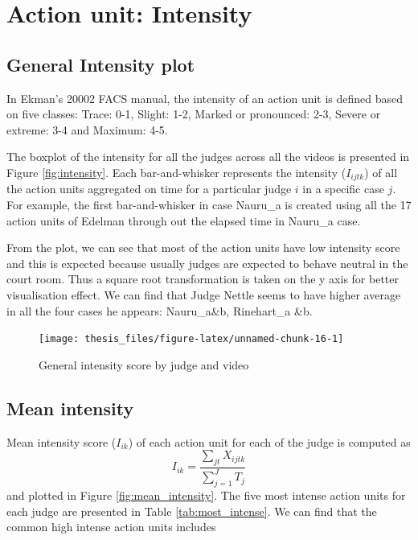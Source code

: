 \documentclass{monashthesis}
\begin{document}
\hypertarget{action-unit-intensity}{%
\section{Action unit: Intensity}\label{action-unit-intensity}}

\hypertarget{general-intensity-plot}{%
\subsection{General Intensity plot}\label{general-intensity-plot}}

In Ekman's 20002 FACS manual, the intensity of an action unit is defined based on five classes: Trace: 0-1, Slight: 1-2, Marked or pronounced: 2-3, Severe or extreme: 3-4 and Maximum: 4-5.

The boxplot of the intensity for all the judges across all the videos is presented in Figure \ref{fig:intensity}. Each bar-and-whisker represents the intensity (\(I_{ijtk}\)) of all the action units aggregated on time for a particular judge \(i\) in a specific case \(j\). For example, the first bar-and-whisker in case Nauru\_a is created using all the 17 action units of Edelman through out the elapsed time in Nauru\_a case.

From the plot, we can see that most of the action units have low intensity score and this is expected because usually judges are expected to behave neutral in the court room. Thus a square root transformation is taken on the y axis for better visualisation effect. We can find that Judge Nettle seems to have higher average in all the four cases he appears: Nauru\_a\&b, Rinehart\_a \&b.

\begin{figure}
\texttt{[image: thesis\_files/figure-latex/unnamed-chunk-16-1]} \caption{General intensity score by judge and video\label{fig:intensity}}\label{fig:unnamed-chunk-16}
\end{figure}

\hypertarget{mean-intensity}{%
\subsection{Mean intensity}\label{mean-intensity}}

Mean intensity score (\(I_{ik}\)) of each action unit for each of the judge is computed as \[I_{ik} = \frac{\sum_{jt}X_{ijtk}}{\sum_{j = 1}^JT_j}\] and plotted in Figure \ref{fig:mean_intensity}. The five most intense action units for each judge are presented in Table \ref{tab:most_intense}. We can find that the common high intense action units includes
\end{document}
